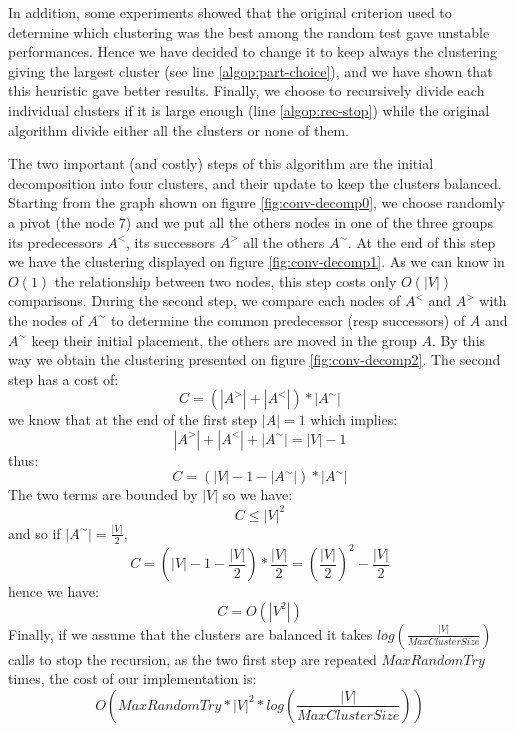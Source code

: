 \documentclass[10pt, conference, compsocconf,pdftex,dvipsnames]{IEEEtran}
\begin{document}
In addition, some experiments showed that the original criterion used to
determine which clustering was the best among the random test gave unstable
performances. Hence we have decided to change it to keep always the clustering
giving the largest cluster (see line \ref{algop:part-choice}), and we have
shown that this heuristic gave better results. Finally, we choose to
recursively divide each individual clusters if it is large enough (line
\ref{algop:rec-stop}) while the original algorithm divide either all the
clusters or none of them.

The two important (and costly) steps of this algorithm are the initial
decomposition into four clusters, and their update to keep the clusters
balanced.  Starting from the graph shown on figure \ref{fig:conv-decomp0}, we
choose randomly a pivot (the node $7$) and we put all the others nodes in one
of the three groups its predecessors $A^<$, its successors $A^>$ all the
others $A^{\sim}$. At the end of this step we have the clustering displayed on
figure \ref{fig:conv-decomp1}. As we can know in $O(1)$ the relationship
between two nodes, this step costs only $O(|V|)$ comparisons. During the second
step, we compare each nodes of $A^<$ and $A^>$ with the nodes of $A^{\sim}$ to
determine the common predecessor (resp successors) of $A$ and $A^{\sim}$ keep
their initial placement, the others are moved in the group $A$.  By this way
we obtain the clustering presented on figure \ref{fig:conv-decomp2}. The
second step has a cost of:
$$C=(|A^>|+|A^<|)*|A^{\sim}|$$ 
we know that at the end of the first step $|A|=1$ which implies: 
$$|A^>|+|A^<|+|A^{\sim}|=|V|-1$$
thus:
$$C=(|V|-1-|A^{\sim}|)*|A^{\sim}|$$ 
The two terms are bounded by $|V|$ so we have: 
$$C\leq|V|^2$$
and so if $|A^{\sim}|=\frac{|V|}{2}$,
$$C=(|V|-1-\frac{|V|}{2})*\frac{|V|}{2}=\left(\frac{|V|}{2}\right)^2-\frac{|V|}{2}$$
hence we have: 
$$C=O(|V^2|)$$ 
Finally, if we assume that the clusters are balanced it takes
$log\left(\frac{|V|}{MaxClusterSize}\right)$ calls to stop the recursion, as
the two first step are repeated $MaxRandomTry$ times, the
cost of our implementation is:
$$O\left(MaxRandomTry*|V|^2*log\left(\frac{|V|}{MaxClusterSize}\right)\right)$$
\end{document}
